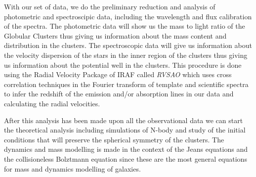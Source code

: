 With our set of data, we do the preliminary reduction and analysis of photometric and spectroscipic data, including the wavelength and flux calibration of the spectra. The photometric data will show us the mass to light ratio of the Globular Clusters thus giving us information about the mass content and distribution in the clusters. The spectroscopic data will give us information about the velocity dispersion of the stars in the inner region of the clusters thus giving us information about the potential well in the clusters. This procedure is done using the Radial Velocity Package of IRAF called \textit{RVSAO} which uses cross correlation techniques in the Fourier transform of template and scientific spectra to infer the redshift of the emission and/or absorption lines in our data and calculating the radial velocities. 

After this analysis has been made upon all the observational data we can start the theoretical analysis including simulations of N-body and study of the initial conditions that will preserve the spherical symmetry of the clusters. The dynamics and mass modelling is made in the context of the Jeans equations and the collisioneless Bolztmann equation since these are the most general equations for mass and dynamics modelling of galaxies.


